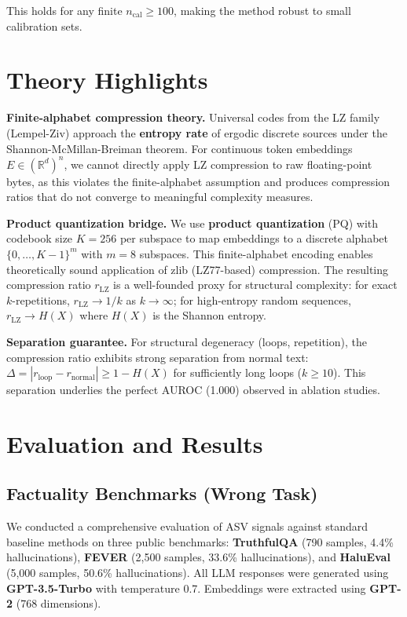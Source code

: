 \documentclass[11pt]{article}
\begin{document}
This holds for any finite $n_{\text{cal}} \geq 100$, making the method robust to small calibration sets.

\section{Theory Highlights}
\label{sec:theory}

\textbf{Finite-alphabet compression theory.} Universal codes from the LZ family (Lempel-Ziv) approach the \textbf{entropy rate} of ergodic discrete sources under the Shannon-McMillan-Breiman theorem. For continuous token embeddings $E \in (\mathbb{R}^d)^n$, we cannot directly apply LZ compression to raw floating-point bytes, as this violates the finite-alphabet assumption and produces compression ratios that do not converge to meaningful complexity measures.

\textbf{Product quantization bridge.} We use \textbf{product quantization} (PQ) with codebook size $K=256$ per subspace to map embeddings to a discrete alphabet $\{0,\dots,K-1\}^m$ with $m=8$ subspaces. This finite-alphabet encoding enables theoretically sound application of zlib (LZ77-based) compression. The resulting compression ratio $r_{\text{LZ}}$ is a well-founded proxy for structural complexity: for exact $k$-repetitions, $r_{\text{LZ}} \rightarrow 1/k$ as $k \rightarrow \infty$; for high-entropy random sequences, $r_{\text{LZ}} \rightarrow H(X)$ where $H(X)$ is the Shannon entropy.

\textbf{Separation guarantee.} For structural degeneracy (loops, repetition), the compression ratio exhibits strong separation from normal text: $\Delta = |r_{\text{loop}} - r_{\text{normal}}| \ge 1 - H(X)$ for sufficiently long loops ($k \ge 10$). This separation underlies the perfect AUROC (1.000) observed in ablation studies.

\section{Evaluation and Results}
\label{sec:evaluation}

\subsection{Factuality Benchmarks (Wrong Task)}
\label{sec:eval-factuality}

We conducted a comprehensive evaluation of ASV signals against standard baseline methods on three public benchmarks: \textbf{TruthfulQA} (790 samples, 4.4\% hallucinations), \textbf{FEVER} (2,500 samples, 33.6\% hallucinations), and \textbf{HaluEval} (5,000 samples, 50.6\% hallucinations). All LLM responses were generated using \textbf{GPT-3.5-Turbo} with temperature 0.7. Embeddings were extracted using \textbf{GPT-2} (768 dimensions).
\end{document}
